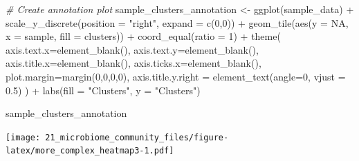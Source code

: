 \documentclass[
]{book}
\newenvironment{Shaded}{\begin{snugshade}}{\end{snugshade}}
\newcommand{\AttributeTok}[1]{\textcolor[rgb]{0.77,0.63,0.00}{#1}}
\newcommand{\CommentTok}[1]{\textcolor[rgb]{0.56,0.35,0.01}{\textit{#1}}}
\newcommand{\ConstantTok}[1]{\textcolor[rgb]{0.00,0.00,0.00}{#1}}
\newcommand{\DecValTok}[1]{\textcolor[rgb]{0.00,0.00,0.81}{#1}}
\newcommand{\FloatTok}[1]{\textcolor[rgb]{0.00,0.00,0.81}{#1}}
\newcommand{\FunctionTok}[1]{\textcolor[rgb]{0.00,0.00,0.00}{#1}}
\newcommand{\NormalTok}[1]{#1}
\newcommand{\OtherTok}[1]{\textcolor[rgb]{0.56,0.35,0.01}{#1}}
\newcommand{\SpecialCharTok}[1]{\textcolor[rgb]{0.00,0.00,0.00}{#1}}
\newcommand{\StringTok}[1]{\textcolor[rgb]{0.31,0.60,0.02}{#1}}
\begin{document}
\begin{Shaded}
\begin{Highlighting}[]
\CommentTok{\# Create annotation plot}
\NormalTok{sample\_clusters\_annotation }\OtherTok{\textless{}{-}} \FunctionTok{ggplot}\NormalTok{(sample\_data) }\SpecialCharTok{+} \FunctionTok{scale\_y\_discrete}\NormalTok{(}\AttributeTok{position =} \StringTok{"right"}\NormalTok{, }\AttributeTok{expand =} \FunctionTok{c}\NormalTok{(}\DecValTok{0}\NormalTok{,}\DecValTok{0}\NormalTok{)) }\SpecialCharTok{+}
  \FunctionTok{geom\_tile}\NormalTok{(}\FunctionTok{aes}\NormalTok{(}\AttributeTok{y =} \ConstantTok{NA}\NormalTok{, }\AttributeTok{x =}\NormalTok{ sample, }\AttributeTok{fill =}\NormalTok{ clusters)) }\SpecialCharTok{+} \FunctionTok{coord\_equal}\NormalTok{(}\AttributeTok{ratio =} \DecValTok{1}\NormalTok{) }\SpecialCharTok{+}
  \FunctionTok{theme}\NormalTok{(}
        \AttributeTok{axis.text.x=}\FunctionTok{element\_blank}\NormalTok{(),}
        \AttributeTok{axis.text.y=}\FunctionTok{element\_blank}\NormalTok{(),}
        \AttributeTok{axis.title.x=}\FunctionTok{element\_blank}\NormalTok{(),}
        \AttributeTok{axis.ticks.x=}\FunctionTok{element\_blank}\NormalTok{(),}
        \AttributeTok{plot.margin=}\FunctionTok{margin}\NormalTok{(}\DecValTok{0}\NormalTok{,}\DecValTok{0}\NormalTok{,}\DecValTok{0}\NormalTok{,}\DecValTok{0}\NormalTok{),}
        \AttributeTok{axis.title.y.right =} \FunctionTok{element\_text}\NormalTok{(}\AttributeTok{angle=}\DecValTok{0}\NormalTok{, }\AttributeTok{vjust =} \FloatTok{0.5}\NormalTok{)}
\NormalTok{        ) }\SpecialCharTok{+}
      \FunctionTok{labs}\NormalTok{(}\AttributeTok{fill =} \StringTok{"Clusters"}\NormalTok{, }\AttributeTok{y =} \StringTok{"Clusters"}\NormalTok{)}

\NormalTok{sample\_clusters\_annotation}
\end{Highlighting}
\end{Shaded}

\texttt{[image: 21\_microbiome\_community\_files/figure-latex/more\_complex\_heatmap3-1.pdf]}
\end{document}

